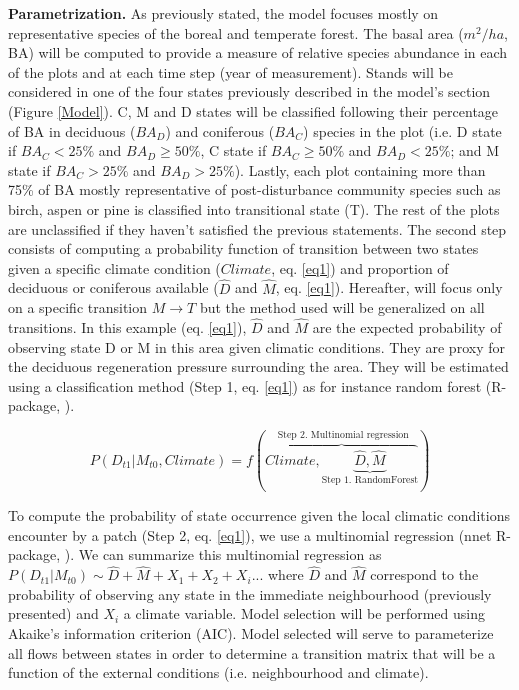 \textbf{Parametrization.} As previously stated, the model focuses mostly on
representative species of the boreal and temperate forest. The basal area
($m^2/ha$, BA) will be computed to provide a measure of relative species
abundance in each of the plots and at each time step (year of measurement).
Stands will be considered in one of the four states previously described in
the model's section (Figure \ref{Model}). C, M and D states will be classified
following their percentage of BA in deciduous ($BA_D$) and coniferous ($BA_C$)
species in the plot (i.e. D state if $BA_C < 25\%$ and $BA_D \geq 50\%$, C
state if ${BA}_C \geq 50\%$ and $BA_D < 25\%$; and M state if $BA_C > 25\%$
and $BA_D > 25\%$). Lastly, each plot containing more than 75\% of BA mostly
representative of post-disturbance community species such as birch, aspen or
pine is classified into transitional state (T). The rest of the plots are
unclassified if they haven't satisfied the previous statements. The second
step consists of computing a probability function of transition between two
states given a specific climate condition ($Climate$, eq. \ref{eq1}) and
proportion of deciduous or coniferous available ($\hat{D}$ and $\hat{M}$, eq.
\ref{eq1}).  Hereafter, will focus only on a specific transition $M
\rightarrow T$ but the method used will be generalized on all transitions.  In
this example (eq. \ref{eq1}),  $\hat{D}$ and $\hat{M}$ are the expected
probability of observing state D or M in this area given climatic conditions.
They are proxy for the deciduous regeneration pressure surrounding the area.
They will be estimated using  a classification method (Step 1, eq. \ref{eq1})
as for instance random forest (R-package, \cite{Liaw2002a}).



\begin{equation}
	P(D_{t1}|M_{t0}, Climate) = f(\overbrace{Climate, \underbrace{\hat{D}, \hat{M}}_\text{Step 1. RandomForest}}^\text{ Step 2. Multinomial regression})
\label{eq1}
\end{equation}


To compute the probability of state occurrence given the local climatic
conditions encounter by a patch (Step 2, eq. \ref{eq1}), we use a multinomial
regression (nnet R-package, \cite{Venables2002}). We can summarize this
multinomial regression as $P(D_{t1}|M_{t0}) \sim \hat{D} + \hat{M} +
X_1+X_2+X_i... $ where $\hat{D}$ and $\hat{M}$ correspond to the probability
of observing any state in the immediate neighbourhood (previously presented)
and $X_i$ a climate variable. Model selection will be performed using Akaike's
information criterion (AIC). Model selected will serve to parameterize all
flows between states in order to determine a transition matrix that will be a
function of the external conditions (i.e. neighbourhood and climate).   \\

